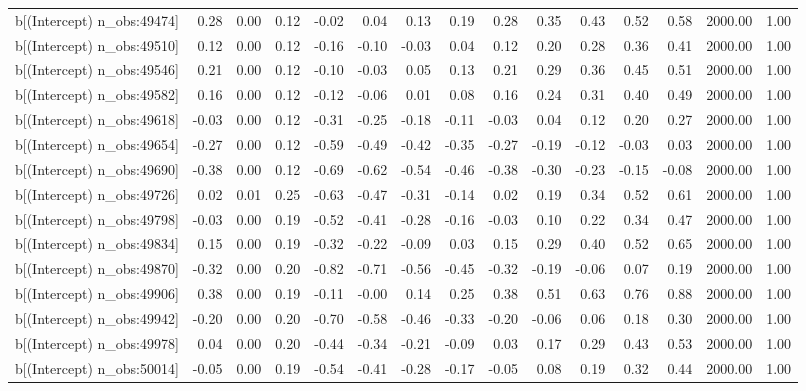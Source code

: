 \begin{table}[ht]
\begin{tabular}{rrrrrrrrrrrrrrr}
  b[(Intercept) n\_obs:49474] & 0.28 & 0.00 & 0.12 & -0.02 & 0.04 & 0.13 & 0.19 & 0.28 & 0.35 & 0.43 & 0.52 & 0.58 & 2000.00 & 1.00 \\ 
  b[(Intercept) n\_obs:49510] & 0.12 & 0.00 & 0.12 & -0.16 & -0.10 & -0.03 & 0.04 & 0.12 & 0.20 & 0.28 & 0.36 & 0.41 & 2000.00 & 1.00 \\ 
  b[(Intercept) n\_obs:49546] & 0.21 & 0.00 & 0.12 & -0.10 & -0.03 & 0.05 & 0.13 & 0.21 & 0.29 & 0.36 & 0.45 & 0.51 & 2000.00 & 1.00 \\ 
  b[(Intercept) n\_obs:49582] & 0.16 & 0.00 & 0.12 & -0.12 & -0.06 & 0.01 & 0.08 & 0.16 & 0.24 & 0.31 & 0.40 & 0.49 & 2000.00 & 1.00 \\ 
  b[(Intercept) n\_obs:49618] & -0.03 & 0.00 & 0.12 & -0.31 & -0.25 & -0.18 & -0.11 & -0.03 & 0.04 & 0.12 & 0.20 & 0.27 & 2000.00 & 1.00 \\ 
  b[(Intercept) n\_obs:49654] & -0.27 & 0.00 & 0.12 & -0.59 & -0.49 & -0.42 & -0.35 & -0.27 & -0.19 & -0.12 & -0.03 & 0.03 & 2000.00 & 1.00 \\ 
  b[(Intercept) n\_obs:49690] & -0.38 & 0.00 & 0.12 & -0.69 & -0.62 & -0.54 & -0.46 & -0.38 & -0.30 & -0.23 & -0.15 & -0.08 & 2000.00 & 1.00 \\ 
  b[(Intercept) n\_obs:49726] & 0.02 & 0.01 & 0.25 & -0.63 & -0.47 & -0.31 & -0.14 & 0.02 & 0.19 & 0.34 & 0.52 & 0.61 & 2000.00 & 1.00 \\ 
  b[(Intercept) n\_obs:49798] & -0.03 & 0.00 & 0.19 & -0.52 & -0.41 & -0.28 & -0.16 & -0.03 & 0.10 & 0.22 & 0.34 & 0.47 & 2000.00 & 1.00 \\ 
  b[(Intercept) n\_obs:49834] & 0.15 & 0.00 & 0.19 & -0.32 & -0.22 & -0.09 & 0.03 & 0.15 & 0.29 & 0.40 & 0.52 & 0.65 & 2000.00 & 1.00 \\ 
  b[(Intercept) n\_obs:49870] & -0.32 & 0.00 & 0.20 & -0.82 & -0.71 & -0.56 & -0.45 & -0.32 & -0.19 & -0.06 & 0.07 & 0.19 & 2000.00 & 1.00 \\ 
  b[(Intercept) n\_obs:49906] & 0.38 & 0.00 & 0.19 & -0.11 & -0.00 & 0.14 & 0.25 & 0.38 & 0.51 & 0.63 & 0.76 & 0.88 & 2000.00 & 1.00 \\ 
  b[(Intercept) n\_obs:49942] & -0.20 & 0.00 & 0.20 & -0.70 & -0.58 & -0.46 & -0.33 & -0.20 & -0.06 & 0.06 & 0.18 & 0.30 & 2000.00 & 1.00 \\ 
  b[(Intercept) n\_obs:49978] & 0.04 & 0.00 & 0.20 & -0.44 & -0.34 & -0.21 & -0.09 & 0.03 & 0.17 & 0.29 & 0.43 & 0.53 & 2000.00 & 1.00 \\ 
  b[(Intercept) n\_obs:50014] & -0.05 & 0.00 & 0.19 & -0.54 & -0.41 & -0.28 & -0.17 & -0.05 & 0.08 & 0.19 & 0.32 & 0.44 & 2000.00 & 1.00 \\ 

\end{tabular}
\end{table}
